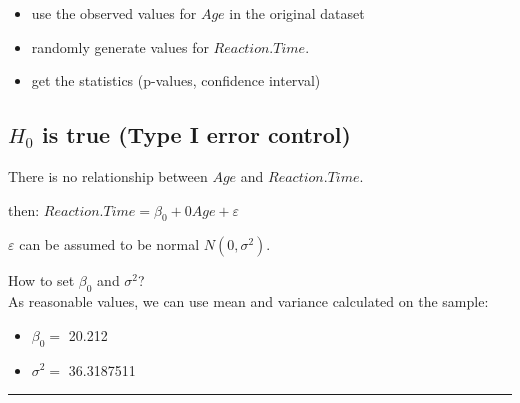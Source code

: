 \documentclass[]{article}
\newenvironment{Shaded}{\begin{snugshade}}{\end{snugshade}}
\newcommand{\KeywordTok}[1]{\textcolor[rgb]{0.13,0.29,0.53}{\textbf{#1}}}
\newcommand{\CommentTok}[1]{\textcolor[rgb]{0.56,0.35,0.01}{\textit{#1}}}
\newcommand{\OperatorTok}[1]{\textcolor[rgb]{0.81,0.36,0.00}{\textbf{#1}}}
\newcommand{\NormalTok}[1]{#1}
\providecommand{\tightlist}{%
  \setlength{\itemsep}{0pt}\setlength{\parskip}{0pt}}
\begin{document}
\begin{itemize}
\tightlist
\item
  use the observed values for \(Age\) in the original dataset\\
\item
  randomly generate values for \(Reaction.Time\).
\item
  get the statistics (p-values, confidence interval)
\end{itemize}

\subsection{\texorpdfstring{\(H_0\) is true (Type I error
control)}{H\_0 is true (Type I error control)}}\label{h_0-is-true-type-i-error-control}

There is no relationship between \(Age\) and \(Reaction.Time\).

then: \(Reaction.Time=\beta_0 + 0 Age + \varepsilon\)

\(\varepsilon\) can be assumed to be normal \(N(0,\sigma^2)\).

How to set \(\beta_0\) and \(\sigma^2\)?\\
As reasonable values, we can use mean and variance calculated on the
sample:

\begin{Shaded}
\end{Shaded}

\begin{itemize}
\tightlist
\item
  \(\beta_0=\) 20.212
\item
  \(\sigma^2=\) 36.3187511
\end{itemize}

\begin{center}\rule{0.5\linewidth}{\linethickness}\end{center}

\begin{Shaded}
\end{Shaded}
\end{document}

